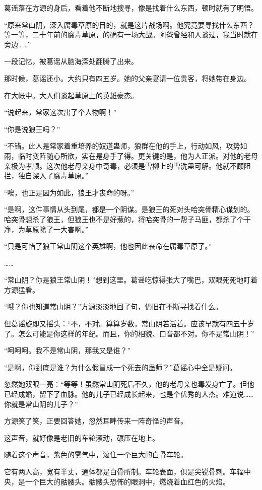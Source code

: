 \begin{this_body}
葛谣落在方源的身后，看着他不断地搜寻，像是找着什么东西，顿时就有了明悟。

“原来常山阴，深入腐毒草原的目的，就是这片战场啊。他究竟要寻找什么东西？等一等，二十年前的腐毒草原，的确有一场大战。阿爸曾经和人谈过，我当时就在旁边……”

一段记忆，被葛谣从脑海深处翻腾了出来。

那时候，葛谣还小。大约只有四五岁。她的父亲宴请一位贵客，将她带在身边。

在大帐中。大人们谈起草原上的英雄豪杰。

“说起来，常家这次出了个人物啊！”

“你是说狼王吗？”

“不错。此人是常家着重培养的奴道蛊师，狼群在他的手上，行动如风，攻势如雨，临时变阵随心所欲，实在是身手了得。更关键的是，他为人正派。对他的老母亲极为孝顺。这次他老母亲身中奇毒，必须是雪柳上的雪洗蛊可解。他就不顾阻拦，独自深入了腐毒草原。”

“唉，也正是因为如此，狼王才丧命的呀。”

“是啊，这件事情从头到尾，都是一个阴谋。是狼王的死对头哈突骨精心谋划的。哈突骨想杀了狼王，但狼王也不是好惹的，将哈突骨的一帮子马匪，都杀了个干净，为草原除了一大害啊。”

“只是可惜了狼王常山阴这个英雄啊，他也因此丧命在腐毒草原了。”

……

“常山阴？你是狼王常山阴！”想到这里。葛谣吃惊得张大了嘴巴，双眼死死地盯着方源猛看。

“哦？你也知道常山阴？”方源淡淡地回了句，仍旧在不断寻找着什么。

但葛谣旋即又摇头：“不，不对。算算岁数，常山阴若活着。应该早就有四五十岁了。怎么可能是你这样的年纪。而且，你的相貌、口音都不对。你不是常山阴！”

“呵呵呵。我不是常山阴，那我又是谁？”

“是啊，你到底是谁？为什么假冒成一个死去的蛊师？”葛谣心中全是疑问。

忽然她双眼一亮：“等等！虽然常山阴死后不久，他的老母亲也毒发身亡了。但他已经成婚，留下了血脉。他的儿子已经成长起来，也是个优秀的人杰。难道说……你就是常山阴的儿子？”

方源笑了笑，正要回答她，忽然耳畔传来一阵奇怪的声音。

这声音，就好像是老旧的车轮滚动，碾压在地上。

随着这个声音，紫色的雾气中，滚住一个巨大的白骨车轮。

它有两人高，宽有半丈，通体都是白骨所制。车轮表面，俱是尖锐骨刺。车辐中央，是一个巨大的骷髅头。骷髅头恐怖的眼洞中，燃烧着血红色的火焰。


\end{this_body}
